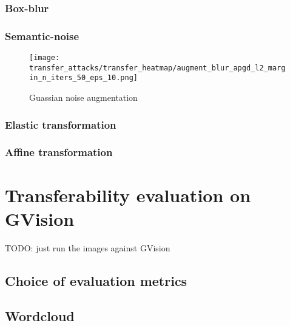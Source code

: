 \subsubsection{Box-blur}
\subsubsection{Semantic-noise}
\begin{figure}[h]
    \centering
    \texttt{[image: transfer\_attacks/transfer\_heatmap/augment\_blur\_apgd\_l2\_margin\_n\_iters\_50\_eps\_10.png]}
    \caption{Guassian noise augmentation}
    \label{fig:fox_blur}
\end{figure}


\subsubsection{Elastic transformation}
\subsubsection{Affine transformation}

\section{Transferability evaluation on GVision}
TODO: just run the images against GVision

\subsection{Choice of evaluation metrics}

\subsection{Wordcloud}